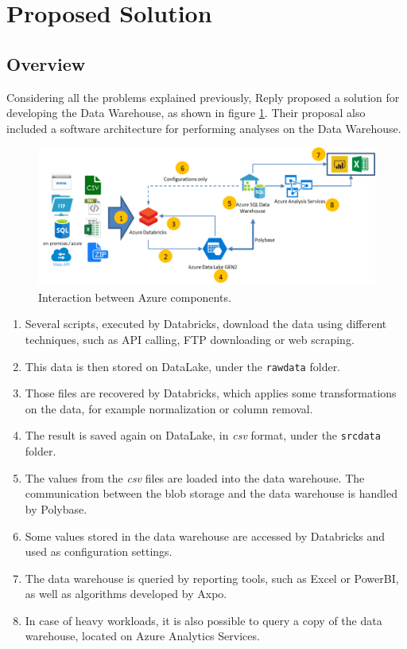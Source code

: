 \part{Proposed Solution}
    \chapter*{Overview}
        Considering all the problems explained previously, Reply proposed a solution for developing the Data Warehouse, as shown in figure \ref{fig:azure:workflow}.
        Their proposal also included a software architecture for performing analyses on the Data Warehouse.
        
        \begin{figure}
            \centering
            \includegraphics[width=\textwidth]{res/azure/workflow.png}
            \caption{Interaction between Azure components.}
            \label{fig:azure:workflow}
        \end{figure}
        
        \begin{enumerate}
            \item Several scripts, executed by Databricks, download the data using different techniques, such as API calling, FTP downloading or web scraping.
            \item This data is then stored on DataLake, under the \texttt{rawdata} folder.
            \item Those files are recovered by Databricks, which applies some transformations on the data, for example normalization or column removal.
            \item The result is saved again on DataLake, in \textit{csv} format, under the \texttt{srcdata} folder.
            \item The values from the \textit{csv} files are loaded into the data warehouse.
            The communication between the blob storage and the data warehouse is handled by Polybase.
            \item Some values stored in the data warehouse are accessed by Databricks and used as configuration settings.
            \item The data warehouse is queried by reporting tools, such as Excel or PowerBI, as well as algorithms developed by Axpo.
            \item In case of heavy workloads, it is also possible to query a copy of the data warehouse, located on Azure Analytics Services.
        \end{enumerate}
        
